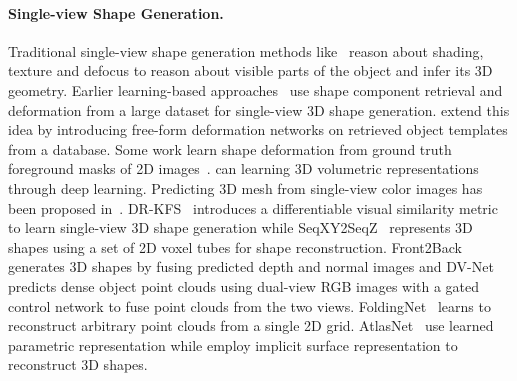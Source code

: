 \paragraph{Single-view Shape Generation.}
Traditional single-view shape generation methods like~\cite{durou2008numerical,zhang1999shape,favaro2005geometric} reason about shading, texture and defocus to reason about visible parts of the object and infer its 3D geometry.
Earlier learning-based approaches~\cite{huang2015single, su2014estimating} use shape component retrieval and deformation from a large dataset for single-view 3D shape generation.
\cite{kurenkov2018deformnet} extend this idea by introducing free-form deformation networks on retrieved object templates from a database.
Some work learn shape deformation from ground truth foreground masks of 2D images~\cite{kar2015category,yan2016perspective,tulsiani2017multi}.
\cite{3dr2n2,hane2017hierarchical,johnston2017scaling} can learning 3D volumetric representations through deep learning.
Predicting 3D mesh from single-view color images has been proposed in~\cite{wang2018pixel2mesh,pan2019deep,gkioxari2019meshrcnn, tang2019skeleton}.
DR-KFS~\cite{jin2019drkfs} introduces a differentiable visual similarity metric to learn single-view 3D shape generation
while SeqXY2SeqZ~\cite{han2020seqxy2seqz} represents 3D shapes using a set of 2D voxel tubes for shape reconstruction.
Front2Back~\cite{yao2020front2back} generates 3D shapes by fusing predicted depth and normal images and
DV-Net~\cite{jia2020dv} predicts dense object point clouds using dual-view RGB images with a gated control network to fuse point clouds from the two views.
FoldingNet~\cite{yang2018foldingnet} learns to reconstruct arbitrary point clouds from a single 2D grid.
AtlasNet~\cite{groueix2018papier} use learned parametric representation
while \cite{mescheder2019occupancy,park2019deepsdf,liu2019learning,liu2019dist,murez2020atlas} employ implicit surface representation to reconstruct 3D shapes.

